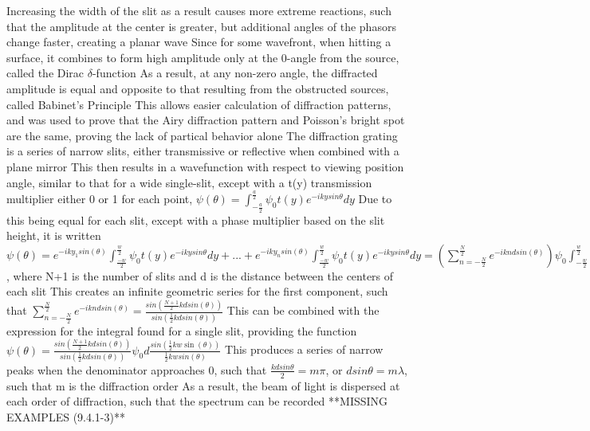 \documentclass[11 pt, twoside]{article}
\newenvironment{outline*}
{
	\begin{outline}[enumerate]
	}
	{\end{outline}
}
\begin{document}
\begin{outline*}
\2 Increasing the width of the slit as a result causes more extreme reactions, such that the amplitude at the center is greater, but additional angles of the phasors change faster, creating a planar wave
\1 Since for some wavefront, when hitting a surface, it combines to form high amplitude only at the 0-angle from the source, called the Dirac $\delta$-function
\2 As a result, at any non-zero angle, the diffracted amplitude is equal and opposite to that resulting from the obstructed sources, called Babinet's Principle
\2 This allows easier calculation of diffraction patterns, and was used to prove that the Airy diffraction pattern and Poisson's bright spot are the same, proving the lack of partical behavior alone
\1 The diffraction grating is a series of narrow slits, either transmissive or reflective when combined with a plane mirror
\2 This then results in a wavefunction with respect to viewing position angle, similar to that for a wide single-slit, except with a t(y) transmission multiplier either 0 or 1 for each point, $\psi(\theta) = \int^{\frac{a}{2}}_{-\frac{a}{2}} \psi_0t(y)e^{-ikysin\theta}dy$
\3 Due to this being equal for each slit, except with a phase multiplier based on the slit height, it is written $\psi(\theta) = e^{-iky_1sin(\theta)}\int^{\frac{w}{2}}_{\frac{-w}{2}} \psi_0t(y)e^{-ikysin\theta}dy + ... + e^{-iky_nsin(\theta)}\int^{\frac{w}{2}}_{\frac{-w}{2}} \psi_0t(y)e^{-ikysin\theta}dy = (\sum^\frac{N}{2}_{n = -\frac{N}{2}} e^{-ikndsin(\theta)})\psi_0\int^{\frac{w}{2}}_{-\frac{w}{2}} e^{-ikysin\theta}dy$, where N+1 is the number of slits and d is the distance between the centers of each slit
\3 This creates an infinite geometric series for the first component, such that $\sum^\frac{N}{2}_{n = -\frac{N}{2}} e^{-ikndsin(\theta)} = \frac{sin(\frac{N+1}{2}kdsin(\theta))}{sin(\frac{1}{2}kdsin(\theta))}$
\3 This can be combined with the expression for the integral found for a single slit, providing the function $\psi(\theta) = \frac{sin(\frac{N+1}{2}kdsin(\theta))}{sin(\frac{1}{2}kdsin(\theta))}\psi_0d\frac{sin(\frac{1}{2}kw\sin(\theta))}{\frac{1}{2}kwsin(\theta)}$
\2 This produces a series of narrow peaks when the denominator approaches 0, such that $\frac{kdsin\theta}{2} = m\pi$, or $dsin\theta = m\lambda$, such that m is the diffraction order
\3 As a result, the beam of light is dispersed at each order of diffraction, such that the spectrum can be recorded
\2 **MISSING EXAMPLES (9.4.1-3)**
\end{outline*}
\end{document}
